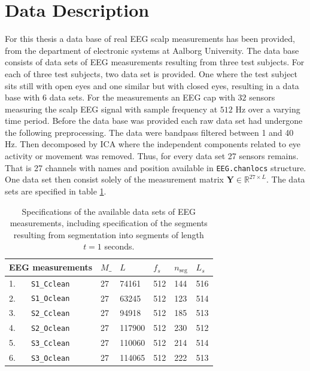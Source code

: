 \section{Data Description}
For this thesis a data base of real EEG scalp measurements has been provided, from the department of electronic systems at Aalborg University. 
The data base consists of data sets of EEG measurements resulting from three test subjects. 
For each of three test subjects, two data set is provided. One where the test subject sits still with open eyes and one similar but with closed eyes, resulting in a data base with 6 data sets. 
For the measurements an EEG cap with $32$ sensors measuring the scalp EEG signal with sample frequency at $512$ Hz over a varying time period.
Before the data base was provided each raw data set had undergone the following preprocessing.
The data were bandpass filtered between 1 and 40 Hz. Then decomposed by ICA where the independent components related to eye activity or movement was removed. 
Thus, for every data set 27 sensors remains. That is 27 channels with names and position available in \texttt{EEG.chanlocs} structure.
One data set then consist solely of the measurement matrix $\mathbf{Y} \in \mathbb{R}^{27\times L}$.
The data sets are specified in table \ref{tab:data_spec}.
\begin{table}[H]
\centering
\begin{tabular}{|l|l|l|l|l|l|l|}
\hline
 \multicolumn{2}{|l|}{EEG measurements } & $M\_$ & $L$    & $f_s$ & $n_{\text{seg}}$ & $L_s$ \\ \hline
1.& \texttt{S1\_Cclean} & 27  & 74161  & 512   & 144       & 516   \\ \hline
2.& \texttt{S1\_Oclean} & 27  & 63245  & 512   & 123       & 514   \\ \hline
3.& \texttt{S2\_Cclean} & 27  & 94918  & 512   & 185       & 513   \\ \hline
4.& \texttt{S2\_Oclean} & 27  & 117900 & 512   & 230       & 512   \\ \hline
5.& \texttt{S3\_Cclean} & 27  & 110060 & 512   & 214       & 514   \\ \hline
6.& \texttt{S3\_Oclean} & 27  & 114065 & 512   & 222        & 513    \\ \hline
\end{tabular}
\caption{Specifications of the available data sets of EEG measurements, including specification of the segments resulting from segmentation into segments of length $t=1$ seconds.}
\label{tab:data_spec}
\end{table}
\noindent

